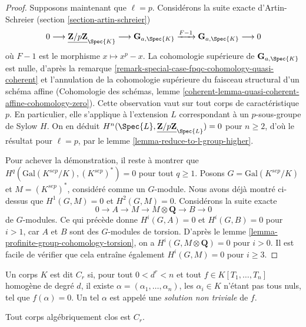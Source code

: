\begin{proof}
\medskip\noindent
Supposons maintenant que $\ell = p$. Considérons la
suite exacte d'Artin-Schreier (section \ref{section-artin-schreier})
$$
0 \longrightarrow \underline{\mathbf{Z}/p\mathbf{Z}}_{\Spec{K}} \longrightarrow
\mathbf{G}_{a, \Spec{K}} \xrightarrow{F-1} \mathbf{G}_{a, \Spec{K}} 
\longrightarrow 0
$$
où $F - 1$ est le morphisme $x \mapsto x^p - x$. La cohomologie supérieure
de $\mathbf{G}_{a, \Spec{K}}$ est nulle, d'après la remarque
\ref{remark-special-case-fpqc-cohomology-quasi-coherent} et l'annulation de la
cohomologie supérieure du faisceau structural d'un schéma affine
(Cohomologie des schémas, lemme
\ref{coherent-lemma-quasi-coherent-affine-cohomology-zero}).
Cette observation vaut sur tout corps de
caractéristique $p$. En particulier, elle s'applique à l'extension $L$
correspondant à un $p$-sous-groupe de Sylow $H$. On en déduit
$H^n(\Spec{L}, \underline{\mathbf{Z}/p\mathbf{Z}}_{\Spec{L}}) = 0$
pour $n \geq 2$, d'où le résultat pour $\ell = p$, par le
lemme \ref{lemma-reduce-to-l-group-higher}.

\medskip\noindent
Pour achever la démonstration, il reste à montrer que
$H^q(\text{Gal}(K^{sep}/K), (K^{sep})^*) = 0$ pour tout $q \geq 1$.
Posons $G = \text{Gal}(K^{sep}/K)$ et $M = (K^{sep})^*$,
considéré comme un $G$-module. Nous avons déjà montré ci-dessus que
$H^1(G, M) = 0$ et $H^2(G, M) = 0$. Considérons la suite exacte
$$
0 \to A \to M \to M \otimes \mathbf{Q} \to B \to 0
$$
de $G$-modules. Ce qui précède donne $H^i(G, A) = 0$
et $H^i(G, B) = 0$ pour $i > 1$, car $A$ et $B$ sont des
$G$-modules de torsion. D'après le
lemme \ref{lemma-profinite-group-cohomology-torsion},
on a $H^i(G, M \otimes \mathbf{Q}) = 0$ pour $i > 0$.
Il est facile de vérifier que cela entraîne également
$H^i(G, M) = 0$ pour $i \geq 3$.
\end{proof}


\begin{definition}
\label{definition-Cr}
Un corps $K$ est dit {\it $C_r$}
si, pour tout $0 < d^r < n$ et tout $f \in K[T_1,
\ldots, T_n]$ homogène de degré $d$, il existe $\alpha = (\alpha_1,
\ldots, \alpha_n)$, les $\alpha_i \in K$ n'étant pas tous nuls, tel que $f(\alpha) = 0$.
Un tel $\alpha$ est appelé une {\it solution non triviale} de $f$.
\end{definition}

\begin{example}
\label{example-algebraically-closed-field-Cr}
Tout corps algébriquement clos est $C_r$.
\end{example}

